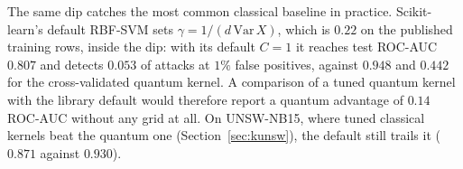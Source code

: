 The same dip catches the most common classical baseline in practice. Scikit-learn's default RBF-SVM sets
$\gamma=1/(d\,\mathrm{Var}\,X)$, which is $0.22$ on the published training rows, inside the dip: with its
default $C=1$ it reaches test ROC-AUC $0.807$ and detects $0.053$ of attacks at $1\%$ false positives,
against $0.948$ and $0.442$ for the cross-validated quantum kernel. A comparison of a tuned quantum kernel
with the library default would therefore report a quantum advantage of $0.14$ ROC-AUC without any grid
at all. On UNSW-NB15, where tuned classical kernels beat the quantum one (Section~\ref{sec:kunsw}), the
default still trails it ($0.871$ against $0.930$).
